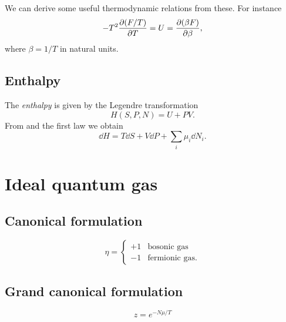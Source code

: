 We can derive some useful thermodynamic relations from these. For
instance
\begin{equation}\label{eq:dfdt}
  -T^2\pdv{(F/T)}{T}=U=\pdv{(\beta F)}{\beta},
\end{equation}
where $\beta=1/T$ in natural units.


\subsection{Enthalpy}

The {\it enthalpy} is given by the Legendre transformation
\begin{equation}\label{eq:enthalpy}
 H(S,P,N)=U+PV.
\end{equation}
From  and the first law we obtain
\begin{equation}
 \dd H = T\dd{S} +V\dd{P} +\sum_i\mu_i\dd N_i.
\end{equation}


\section{Ideal quantum gas}

\subsection{Canonical formulation}

\begin{equation}
\eta=
  \begin{cases}
     +1 & \text{bosonic gas} \\
     -1 & \text{fermionic gas}.
  \end{cases}
\end{equation}

\subsection{Grand canonical formulation}

\begin{equation}\label{eq:fugacity}
  z=e^{-N\mu/T}
\end{equation}

